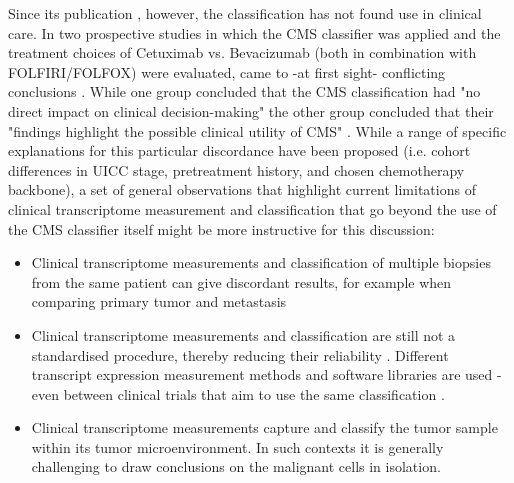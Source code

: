 \begin{flushleft}
Since its publication \citep{guinneyConsensusMolecularSubtypes2015}, however, the classification has not found use in clinical care. In two prospective studies in which the CMS classifier was applied and the treatment choices of Cetuximab vs. Bevacizumab (both in combination with FOLFIRI/FOLFOX) were evaluated, came to -at first sight- conflicting conclusions \citep{stintzingConsensusMolecularSubgroups2019, lenzImpactConsensusMolecular2019, aderkaExplainingUnexplainableDiscrepancies2019, sveenPredictiveModelingColorectal2019}. While one group concluded that the CMS classification had "no direct impact on clinical decision-making" \citep{stintzingConsensusMolecularSubgroups2019,} the other group concluded that their "findings highlight the possible clinical utility of CMS" \citep{lenzImpactConsensusMolecular2019}. While a range of specific explanations for this particular discordance have been proposed (i.e. cohort differences in UICC stage, pretreatment history, and chosen chemotherapy backbone), a set of general observations that highlight current limitations of clinical transcriptome measurement and classification that go beyond the use of the CMS classifier itself might be more instructive for this discussion: 

\begin{itemize} 
    \item Clinical transcriptome measurements and classification of multiple biopsies from the same patient can give discordant results, for example when comparing primary tumor and metastasis \citep{eideMetastaticHeterogeneityConsensus2021}  
    \item Clinical transcriptome measurements and classification are still not a standardised procedure, thereby reducing their reliability \citep{sveenPredictiveModelingColorectal2019}. Different transcript expression measurement methods and software libraries are used - even between clinical trials that aim to use the same classification \citep{stintzingConsensusMolecularSubgroups2019, lenzImpactConsensusMolecular2019}.
    \item Clinical transcriptome measurements capture and classify the tumor sample within its tumor microenvironment. In such contexts it is generally challenging to draw conclusions on the malignant cells in isolation.
\end{itemize}


\end{flushleft}
